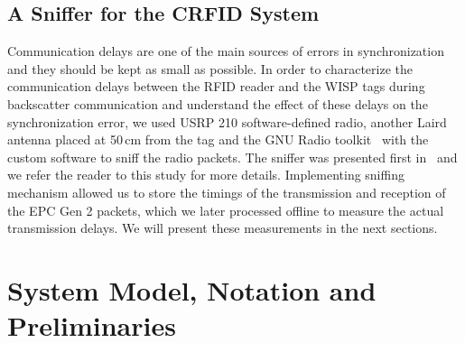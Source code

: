 \documentclass[journal,draftcls,onecolumn,12pt,twoside]{IEEEtranTCOM}
\begin{document}
\subsection{\label{sec:sniffer}A Sniffer for the CRFID System}


Communication delays are one of the main sources of errors in synchronization~\cite{Maroti2004} and they should be kept as small as possible. In order to characterize the communication delays between the RFID reader and the WISP tags during backscatter communication and understand the effect of these delays on the synchronization error, we used USRP 210 software-defined radio, another Laird antenna placed at 50\,cm from the tag and the GNU Radio toolkit~\cite{gnuradio} with the custom software to sniff the radio packets. The sniffer was presented first in~\cite{stork:2017} and we refer the reader to this study for more details. Implementing sniffing mechanism allowed us to store the timings of the transmission and reception of the EPC Gen 2 packets, which we later processed offline to measure the actual transmission delays. We will present these measurements in the next sections. 
\section{System Model, Notation and Preliminaries}
\label{sec:clock_model}
\end{document}
